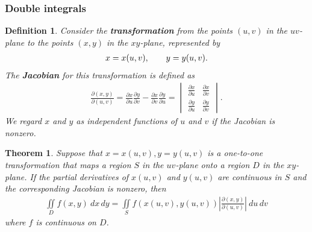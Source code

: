 \documentclass{article}
\theoremstyle{sltheorem}
\newtheorem{definition}{Definition}[section]
\newtheorem{theorem}{Theorem}[section]
\newcommand{\di}{\iint\limits}
\newcommand{\hs}{\hspace{0.7cm}}
\newcommand*\B[1]{\textbf{#1}}
\begin{document}
\subsubsection{Double integrals}
\begin{definition}
    Consider the \B{transformation} from the points $(u,v)$ in the $uv$-plane to the points $(x,y)$
    in the $xy$-plane, represented by
    \begin{align*}
        x = x(u,v),\hs y=y(u,v).
    \end{align*}
    The \B{Jacobian} for this transformation is defined as
    \begin{align*}
        \frac{\partial(x,y)}{\partial(u,v)}
        =\frac{\partial x}{\partial u}\frac{\partial y}{\partial v}
        - \frac{\partial x}{\partial v}\frac{\partial y}{\partial u}
        =\begin{vmatrix}
            \frac{\partial x}{\partial u} &\frac{\partial x}{\partial v}\\
            \frac{\partial y}{\partial u} &\frac{\partial y}{\partial v}
        \end{vmatrix}.
    \end{align*}
    We regard $x$ and $y$ as independent functions of $u$ and $v$ if the Jacobian is nonzero.
\end{definition}
\begin{theorem}
    Suppose that $x=x(u,v), y=y(u,v)$ is a one-to-one transformation that maps a region
    $S$ in the $uv$-plane onto a region $D$ in the $xy$-plane. If the partial derivatives
    of $x(u,v)$ and $y(u,v)$ are continuous in $S$ and the corresponding Jacobian is nonzero,
    then
    \begin{align*}
        \di_D f(x,y)\:dx\,dy = \di_S f(x(u,v), y(u,v))\left|\frac{\partial(x,y)}{\partial(u,v)}\right|\:du\,dv
    \end{align*}
    where $f$ is continuous on $D$.
\end{theorem}
\end{document}
